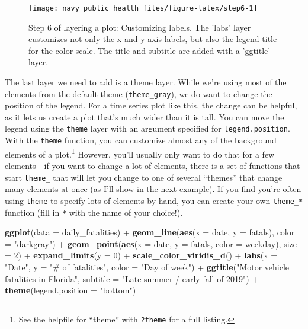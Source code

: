 \documentclass[]{tufte-book}
\newenvironment{Shaded}{}{}
\newcommand{\DataTypeTok}[1]{\textcolor[rgb]{0.56,0.13,0.00}{#1}}
\newcommand{\DecValTok}[1]{\textcolor[rgb]{0.25,0.63,0.44}{#1}}
\newcommand{\KeywordTok}[1]{\textcolor[rgb]{0.00,0.44,0.13}{\textbf{#1}}}
\newcommand{\NormalTok}[1]{#1}
\newcommand{\OperatorTok}[1]{\textcolor[rgb]{0.40,0.40,0.40}{#1}}
\newcommand{\StringTok}[1]{\textcolor[rgb]{0.25,0.44,0.63}{#1}}
\begin{document}
\begin{figure*}
\texttt{[image: navy\_public\_health\_files/figure-latex/step6-1]} \caption[Step 6 of layering a plot]{Step 6 of layering a plot: Customizing labels. The 'labs' layer customizes not only the x and y axis labels, but also the legend title for the color scale. The title and subtitle are added with a 'ggtitle' layer.}\label{fig:step6}
\end{figure*}

The last layer we need to add is a theme layer. While we're using most of the
elements from the default theme (\texttt{theme\_gray}), we do want to change the position
of the legend. For a time series plot like this, the change can be helpful, as it
lets us create a plot that's much wider than it is tall. You can move the legend
using the \texttt{theme} layer with an argument specified for \texttt{legend.position}. With
the \texttt{theme} function, you can customize almost any of the background elements of a
plot.\footnote{See the helpfile for ``theme'' with \texttt{?theme} for a full listing.}
However, you'll usually only want to do that for a few elements---if you want
to change a lot of elements, there is a set of functions that start \texttt{theme\_} that
will let you change to one of several ``themes'' that change many elements at once
(as I'll show in the next example).
If you find you're often using \texttt{theme} to specify lots of elements by hand, you
can create your own \texttt{theme\_*} function (fill in \texttt{*} with the name of your choice!).

\begin{Shaded}
\begin{Highlighting}[]
\KeywordTok{ggplot}\NormalTok{(}\DataTypeTok{data =}\NormalTok{ daily_fatalities) }\OperatorTok{+}\StringTok{ }\KeywordTok{geom_line}\NormalTok{(}\KeywordTok{aes}\NormalTok{(}\DataTypeTok{x =}\NormalTok{ date, }
    \DataTypeTok{y =}\NormalTok{ fatals), }\DataTypeTok{color =} \StringTok{"darkgray"}\NormalTok{) }\OperatorTok{+}\StringTok{ }\KeywordTok{geom_point}\NormalTok{(}\KeywordTok{aes}\NormalTok{(}\DataTypeTok{x =}\NormalTok{ date, }
    \DataTypeTok{y =}\NormalTok{ fatals, }\DataTypeTok{color =}\NormalTok{ weekday), }\DataTypeTok{size =} \DecValTok{2}\NormalTok{) }\OperatorTok{+}\StringTok{ }
\StringTok{    }\KeywordTok{expand_limits}\NormalTok{(}\DataTypeTok{y =} \DecValTok{0}\NormalTok{) }\OperatorTok{+}\StringTok{ }\KeywordTok{scale_color_viridis_d}\NormalTok{() }\OperatorTok{+}\StringTok{ }
\StringTok{    }\KeywordTok{labs}\NormalTok{(}\DataTypeTok{x =} \StringTok{"Date"}\NormalTok{, }\DataTypeTok{y =} \StringTok{"# of fatalities"}\NormalTok{, }\DataTypeTok{color =} \StringTok{"Day of week"}\NormalTok{) }\OperatorTok{+}\StringTok{ }
\StringTok{    }\KeywordTok{ggtitle}\NormalTok{(}\StringTok{"Motor vehicle fatalities in Florida"}\NormalTok{, }
        \DataTypeTok{subtitle =} \StringTok{"Late summer / early fall of 2019"}\NormalTok{) }\OperatorTok{+}\StringTok{ }
\StringTok{    }\KeywordTok{theme}\NormalTok{(}\DataTypeTok{legend.position =} \StringTok{"bottom"}\NormalTok{)}
\end{Highlighting}
\end{Shaded}
\end{document}

